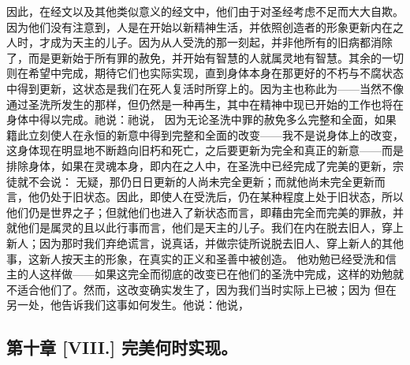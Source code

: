 因此，在经文以及其他类似意义的经文中，他们由于对圣经考虑不足而大大自欺。因为他们没有注意到，人是在开始以新精神生活，并依照创造者的形象更新内在之人时，才成为天主的儿子。因为从人受洗的那一刻起，并非他所有的旧病都消除了，而是更新始于所有罪的赦免，并开始有智慧的人就属灵地有智慧。其余的一切则在希望中完成，期待它们也实际实现，直到身体本身在那更好的不朽与不腐状态中得到更新，这状态是我们在死人复活时所穿上的。因为主也称此为——当然不像通过圣洗所发生的那样，但仍然是一种再生，其中在精神中现已开始的工作也将在身体中得以完成。祂说：祂说， 因为无论圣洗中罪的赦免多么完整和全面，如果籍此立刻使人在永恒的新意中得到完整和全面的改变——我不是说身体上的改变，这身体现在明显地不断趋向旧朽和死亡，之后要更新为完全和真正的新意——而是排除身体，如果在灵魂本身，即内在之人中，在圣洗中已经完成了完美的更新，宗徒就不会说： 无疑，那仍日日更新的人尚未完全更新；而就他尚未完全更新而言，他仍处于旧状态。因此，即使人在受洗后，仍在某种程度上处于旧状态，所以他们仍是世界之子；但就他们也进入了新状态而言，即藉由完全而完美的罪赦，并就他们是属灵的且以此行事而言，他们是天主的儿子。我们在内在脱去旧人，穿上新人；因为那时我们弃绝谎言，说真话，并做宗徒所说脱去旧人、穿上新人的其他事，这新人按天主的形象，在真实的正义和圣善中被创造。 他劝勉已经受洗和信主的人这样做——如果这完全而彻底的改变已在他们的圣洗中完成，这样的劝勉就不适合他们了。然而，这改变确实发生了，因为我们当时实际上已被；因为 但在另一处，他告诉我们这事如何发生。他说：他说，\par


\subsection{第十章 [VIII.] 完美何时实现。}

